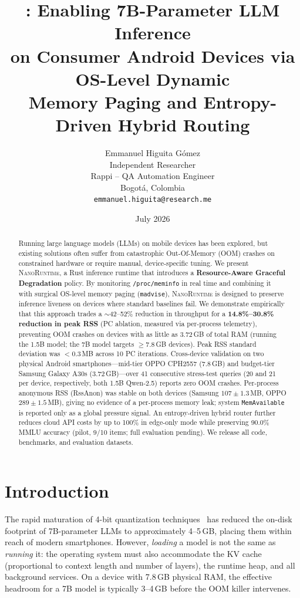 \documentclass[11pt]{article}
\title{\textbf{\nanort}: Enabling 7B-Parameter LLM Inference\\
on Consumer Android Devices via OS-Level Dynamic\\
Memory Paging and Entropy-Driven Hybrid Routing}
\author{Emmanuel Higuita G\'omez\\
\small Independent Researcher\\
\small Rappi -- QA Automation Engineer\\
\small Bogot\'a, Colombia\\
\small \texttt{emmanuel.higuita@research.me}}
\date{July 2026}
\newcommand{\nanort}{\textsc{NanoRuntime}}
\begin{document}
\maketitle

\begin{abstract}
Running large language models (LLMs) on mobile devices has been explored,
but existing solutions often suffer from catastrophic Out-Of-Memory (OOM)
crashes on constrained hardware or require manual, device-specific tuning.
%
We present \nanort{}, a Rust inference runtime that introduces a
\textbf{Resource-Aware Graceful Degradation} policy.
By monitoring \texttt{/proc/meminfo} in real time and combining it with
surgical OS-level memory paging (\texttt{madvise}), \nanort{} is designed to
preserve inference liveness on devices where standard baselines fail.
%
We demonstrate empirically that this approach trades a
$\sim$42--52\% reduction in throughput for a \textbf{14.8\%--30.8\% reduction
in peak RSS} (PC ablation, measured via per-process telemetry), preventing
OOM crashes on devices with as little as 3.72\,GB of total RAM (running the
1.5B model; the 7B model targets $\geq$7.8\,GB devices). Peak RSS standard
deviation was $<$0.3\,MB across 10 PC iterations.
%
Cross-device validation on two physical Android smartphones---mid-tier
OPPO CPH2557 (7.8\,GB) and budget-tier Samsung Galaxy A30s (3.72\,GB)---over
41 consecutive stress-test queries (20 and 21 per device, respectively, both
1.5B Qwen-2.5) reports zero OOM crashes. Per-process anonymous RSS (RssAnon)
was stable on both devices (Samsung $107\pm1.3$\,MB, OPPO $289\pm1.5$\,MB),
giving no evidence of a per-process memory leak; system \texttt{MemAvailable}
is reported only as a global pressure signal.
%
An entropy-driven hybrid router further reduces cloud API costs by up to
100\% in edge-only mode while preserving 90.0\% MMLU accuracy (pilot, 9/10
items; full evaluation pending).
We release all code, benchmarks, and evaluation datasets.
\end{abstract}

\section{Introduction}
\label{sec:intro}

The rapid maturation of 4-bit quantization techniques~\cite{gptq2023,gguf2023,awq2024}
has reduced the on-disk footprint of 7B-parameter LLMs to approximately
4--5\,GB, placing them within reach of modern smartphones.
However, \emph{loading} a model is not the same as \emph{running} it:
the operating system must also accommodate the KV cache (proportional to
context length and number of layers), the runtime heap, and all background
services. On a device with 7.8\,GB physical RAM, the effective headroom
for a 7B model is typically 3--4\,GB before the OOM killer intervenes.
\end{document}
